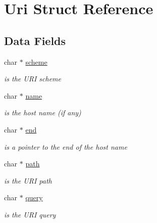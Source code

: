 \hypertarget{structUri}{}\section{Uri Struct Reference}
\label{structUri}
\subsection*{Data Fields}
\begin{DoxyCompactItemize}
\item 
\mbox{\label{structUri_aba1d07da02f44b0162a3cd48f8efce38}} 
char $\ast$ \hyperlink{structUri_aba1d07da02f44b0162a3cd48f8efce38}{scheme}
\begin{DoxyCompactList}\small\item\em is the U\+RI scheme \end{DoxyCompactList}\item 
\mbox{\label{structUri_a1032753591bdf29f88fba2fcd42e8df8}} 
char $\ast$ \hyperlink{structUri_a1032753591bdf29f88fba2fcd42e8df8}{name}
\begin{DoxyCompactList}\small\item\em is the host name (if any) \end{DoxyCompactList}\item 
\mbox{\label{structUri_ae28e8f4bcabd1bf2ef39a2709100fe13}} 
char $\ast$ \hyperlink{structUri_ae28e8f4bcabd1bf2ef39a2709100fe13}{end}
\begin{DoxyCompactList}\small\item\em is a pointer to the end of the host name \end{DoxyCompactList}\item 
\mbox{\label{structUri_afdf2447fd4fd8eb4a961130a3a814766}} 
char $\ast$ \hyperlink{structUri_afdf2447fd4fd8eb4a961130a3a814766}{path}
\begin{DoxyCompactList}\small\item\em is the U\+RI path \end{DoxyCompactList}\item 
\mbox{\label{structUri_ad9f9401506523decf6717bd39c9c702b}} 
char $\ast$ \hyperlink{structUri_ad9f9401506523decf6717bd39c9c702b}{query}
\begin{DoxyCompactList}\small\item\em is the U\+RI query \end{DoxyCompactList}\item 

\end{DoxyCompactItemize}
